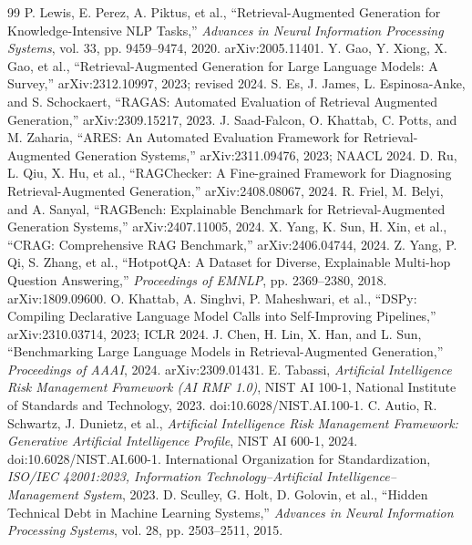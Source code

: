 \documentclass[11pt]{article}
\begin{document}
\begin{thebibliography}{99}
 P. Lewis, E. Perez, A. Piktus, et al., ``Retrieval-Augmented Generation for Knowledge-Intensive NLP Tasks,'' \emph{Advances in Neural Information Processing Systems}, vol. 33, pp. 9459--9474, 2020. arXiv:2005.11401.
 Y. Gao, Y. Xiong, X. Gao, et al., ``Retrieval-Augmented Generation for Large Language Models: A Survey,'' arXiv:2312.10997, 2023; revised 2024.
 S. Es, J. James, L. Espinosa-Anke, and S. Schockaert, ``RAGAS: Automated Evaluation of Retrieval Augmented Generation,'' arXiv:2309.15217, 2023.
 J. Saad-Falcon, O. Khattab, C. Potts, and M. Zaharia, ``ARES: An Automated Evaluation Framework for Retrieval-Augmented Generation Systems,'' arXiv:2311.09476, 2023; NAACL 2024.
 D. Ru, L. Qiu, X. Hu, et al., ``RAGChecker: A Fine-grained Framework for Diagnosing Retrieval-Augmented Generation,'' arXiv:2408.08067, 2024.
 R. Friel, M. Belyi, and A. Sanyal, ``RAGBench: Explainable Benchmark for Retrieval-Augmented Generation Systems,'' arXiv:2407.11005, 2024.
 X. Yang, K. Sun, H. Xin, et al., ``CRAG: Comprehensive RAG Benchmark,'' arXiv:2406.04744, 2024.
 Z. Yang, P. Qi, S. Zhang, et al., ``HotpotQA: A Dataset for Diverse, Explainable Multi-hop Question Answering,'' \emph{Proceedings of EMNLP}, pp. 2369--2380, 2018. arXiv:1809.09600.
 O. Khattab, A. Singhvi, P. Maheshwari, et al., ``DSPy: Compiling Declarative Language Model Calls into Self-Improving Pipelines,'' arXiv:2310.03714, 2023; ICLR 2024.
 J. Chen, H. Lin, X. Han, and L. Sun, ``Benchmarking Large Language Models in Retrieval-Augmented Generation,'' \emph{Proceedings of AAAI}, 2024. arXiv:2309.01431.
 E. Tabassi, \emph{Artificial Intelligence Risk Management Framework (AI RMF 1.0)}, NIST AI 100-1, National Institute of Standards and Technology, 2023. doi:10.6028/NIST.AI.100-1.
 C. Autio, R. Schwartz, J. Dunietz, et al., \emph{Artificial Intelligence Risk Management Framework: Generative Artificial Intelligence Profile}, NIST AI 600-1, 2024. doi:10.6028/NIST.AI.600-1.
 International Organization for Standardization, \emph{ISO/IEC 42001:2023, Information Technology--Artificial Intelligence--Management System}, 2023.
 D. Sculley, G. Holt, D. Golovin, et al., ``Hidden Technical Debt in Machine Learning Systems,'' \emph{Advances in Neural Information Processing Systems}, vol. 28, pp. 2503--2511, 2015.

\end{thebibliography}
\end{document}
